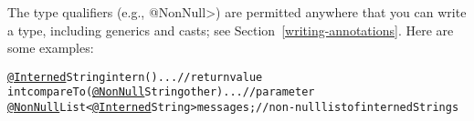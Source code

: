 The type qualifiers (e.g., \<@NonNull>) are permitted anywhere
that you can write a type, including generics and casts; see
Section~\ref{writing-annotations}.  Here are some examples:

\begin{alltt}
  \underline{@Interned} String intern() \ttlcb{} ... \ttrcb{}             // return value
  int compareTo(\underline{@NonNull} String other) \ttlcb{} ... \ttrcb{}  // parameter
  \underline{@NonNull} List<\underline{@Interned} String> messages;     // non-null list of interned Strings
\end{alltt}


%
%
%


